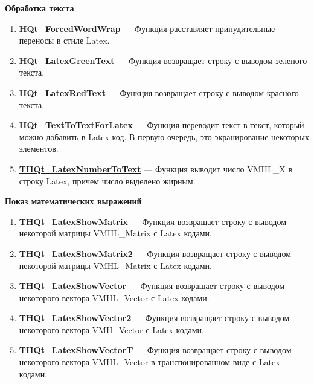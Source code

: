 \documentclass[a4paper,12pt]{article}
\begin{document}
\textbf{Обработка текста}
\begin{enumerate}

\item \textbf{\hyperref[HQt_ForcedWordWrap]{HQt\_ForcedWordWrap}} --- Функция расставляет принудительные переносы в стиле Latex.

\item \textbf{\hyperref[HQt_LatexGreenText]{HQt\_LatexGreenText}} --- Функция возвращает строку с выводом зеленого текста.

\item \textbf{\hyperref[HQt_LatexRedText]{HQt\_LatexRedText}} --- Функция возвращает строку с выводом красного текста.

\item \textbf{\hyperref[HQt_TextToTextForLatex]{HQt\_TextToTextForLatex}} --- Функция переводит текст в текст, который можно добавить в Latex код. В-первую очередь, это экранирование некоторых элементов.

\item \textbf{\hyperref[THQt_LatexNumberToText]{THQt\_LatexNumberToText}} --- Функция выводит число VMHL\_X в строку Latex, причем число выделено жирным.

\end{enumerate}

\textbf{Показ математических выражений}
\begin{enumerate}

\item \textbf{\hyperref[THQt_LatexShowMatrix]{THQt\_LatexShowMatrix}} --- Функция возвращает строку с выводом некоторой матрицы VMHL\_Matrix с Latex кодами.

\item \textbf{\hyperref[THQt_LatexShowMatrix2]{THQt\_LatexShowMatrix2}} --- Функция возвращает строку с выводом некоторой матрицы VMHL\_Matrix с Latex кодами.

\item \textbf{\hyperref[THQt_LatexShowVector]{THQt\_LatexShowVector}} --- Функция возвращает строку с выводом некоторого вектора VMHL\_Vector с Latex кодами.

\item \textbf{\hyperref[THQt_LatexShowVector2]{THQt\_LatexShowVector2}} --- Функция возвращает строку с выводом некоторого вектора VMH\_Vector с Latex кодами.

\item \textbf{\hyperref[THQt_LatexShowVectorT]{THQt\_LatexShowVectorT}} --- Функция возвращает строку с выводом некоторого вектора VMHL\_Vector в транспонированном виде с Latex кодами.

\end{enumerate}
\end{document}
